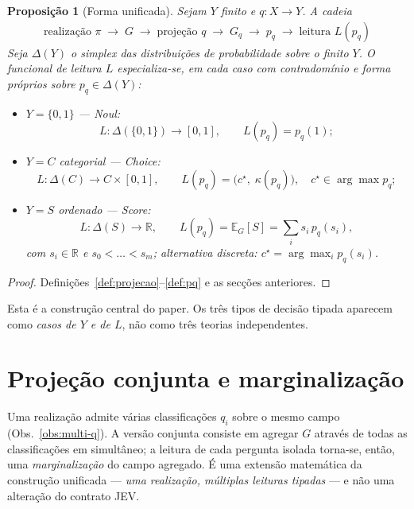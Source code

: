 \documentclass[11pt,a4paper]{article}
\newtheorem{proposicao}{Proposição}
\begin{document}
\begin{proposicao}[Forma unificada]
\label{prop:unificada}
Sejam \(Y\) finito e \(q\colon X\to Y\). A cadeia
\[
\boxed{
\begin{array}{c}
\text{realização }\pi
\;\longrightarrow\;
G
\;\longrightarrow\;
\text{projeção }q
\;\longrightarrow\;
G_q
\;\longrightarrow\;
p_q
\;\longrightarrow\;
\text{leitura }
L(p_q)
\end{array}
}
\]
Seja \(\Delta(Y)\) o simplex das distribuições de probabilidade sobre o finito
\(Y\). O funcional de leitura \(L\) especializa-se, em cada caso com
contradomínio e forma próprios sobre \(p_q\in\Delta(Y)\):
\begin{itemize}[leftmargin=1.5em]
\item \(Y=\{0,1\}\) --- Noul:
      \[
      L\colon\Delta(\{0,1\})\to[0,1],\qquad L(p_q)=p_q(1);
      \]
\item \(Y=C\) categorial --- Choice:
      \[
      L\colon\Delta(C)\to C\times[0,1],\qquad
      L(p_q)=\bigl(c^\star,\;\kappa(p_q)\bigr),\quad c^\star\in\arg\max p_q;
      \]
\item \(Y=S\) ordenado --- Score:
      \[
      L\colon\Delta(S)\to\mathbb R,\qquad
      L(p_q)=\mathbb E_G[S]=\sum_i s_i\,p_q(s_i),
      \]
      com \(s_i\in\mathbb R\) e \(s_0<\dots<s_m\); alternativa discreta:
      \(c^\star=\arg\max_i p_q(s_i)\).
\end{itemize}
\end{proposicao}

\begin{proof}
Definições~\ref{def:projecao}--\ref{def:pq} e as secções anteriores.
\end{proof}

Esta é a construção central do paper. Os três tipos de decisão tipada
aparecem como \emph{casos de \(Y\) e de \(L\)}, não como três teorias
independentes.

\section{Projeção conjunta e marginalização}
\label{sec:conjunta}

Uma realização admite várias classificações \(q_i\) sobre o mesmo campo
(Obs.~\ref{obs:multi-q}). A versão conjunta consiste em agregar \(G\) através
de todas as classificações em simultâneo; a leitura de cada pergunta isolada
torna-se, então, uma \emph{marginalização} do campo agregado. É uma extensão
matemática da construção unificada --- \emph{uma realização, múltiplas leituras
tipadas} --- e não uma alteração do contrato JEV.
\end{document}
